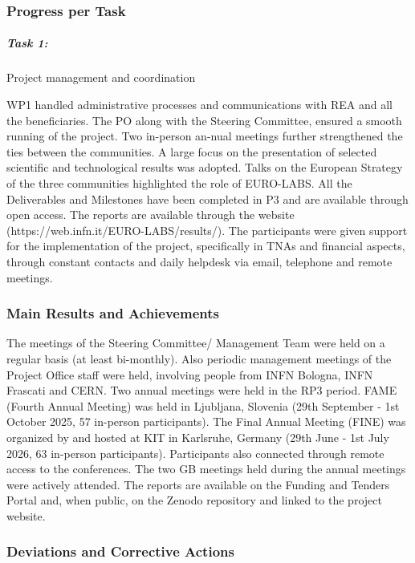 \subsubsection*{Progress per Task}

\subparagraph{Task 1:} Project management and coordination \mbox{}

WP1 handled administrative processes and communications with REA and all the beneficiaries. The PO along with the Steering Committee, ensured a smooth running of the project. Two in-person an-nual meetings further strengthened the ties between the communities. A large focus on the presentation of selected scientific and technological results was adopted. Talks on the European Strategy of the three communities highlighted the role of EURO-LABS. All the Deliverables and Milestones have been completed in P3 and are available through open access. The reports are available through the website (https://web.infn.it/EURO-LABS/results/). The participants were given support for the implementation of the project, specifically in TNAs and financial aspects, through constant contacts and daily helpdesk via email, telephone and remote meetings.

\subsubsection*{Main Results and Achievements}
The meetings of the Steering Committee/ Management Team were held on a regular basis (at least bi-monthly). Also periodic management meetings of the Project Office staff were held, involving people from INFN Bologna, INFN Frascati and CERN. Two annual meetings were held in the RP3 period. FAME (Fourth Annual Meeting) was held in Ljubljana, Slovenia (29th September - 1st October 2025, 57 in-person participants). The Final Annual Meeting (FINE) was organized by and hosted at KIT in Karlsruhe, Germany (29th June - 1st July 2026, 63 in-person participants). Participants also connected through remote access to the conferences. The two GB meetings held during the annual meetings were actively attended. The reports are available on the Funding and Tenders Portal and, when public, on the Zenodo repository and linked to the project website.


\subsubsection*{Deviations and Corrective Actions}
\label{sec:wp1_deviations}

